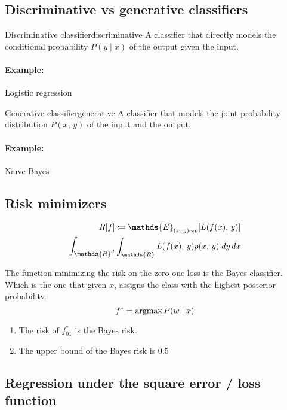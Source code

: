 \subsection{Discriminative vs generative classifiers}

\begin{definition}{Discriminative classifier}{discriminative}
	A classifier that directly models the conditional probability
	\(P(y \mid x)\) of the output given the input.
	\tcblower
	\paragraph{Example:} Logistic regression
\end{definition}

\begin{definition}{Generative classifier}{generative}
	A classifier that models the joint probability distribution
	\(P(x,\, y)\) of the input and the output.
	\tcblower
	\paragraph{Example:} Naïve Bayes
\end{definition}

\subsection{Risk minimizers}

\begin{align*}
	R[f] \coloneqq \mathds{E}_{(x,\, y) \sim p} [ L(f(x),\, y) ] \\
	\mathlarger{\int_{\mathds{R}^d}} \int_{\mathds{R}} L(f(x),\, y) p(x,\, y)\; dy\, dx
\end{align*}

\begin{prop}{}{}
	The function minimizing the risk on the zero-one loss is the Bayes
	classifier. Which is the one that given $x$, assigns the class with the
	highest posterior probability.
	\[f^* = \operatorname{argmax} {P(w \mid x)}\]
	\begin{enumerate}
		\item The risk of \(f_{01}^*\) is the Bayes risk.
		\item The upper bound of the Bayes risk is 0.5
	\end{enumerate}
\end{prop}

\subsection{Regression under the square error / loss function}


